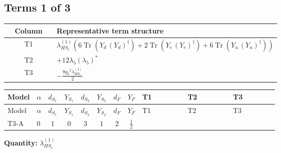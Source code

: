 \documentclass[8pt]{article}
\begin{document}
\begin{landscape}
\subsection*{Terms 1 of 3}
\begin{center}
\begin{tabular}{@{}c >{\raggedright\arraybackslash}p{0.82\linewidth}@{}}
\toprule
Column & Representative term structure \\
\midrule
T1 & \(\displaystyle {\lambda_{HS_1}^{(1)}} (6 \operatorname{Tr}\!\left({Y_d}\,\left({Y_d}\right)^{\dagger}\right)+2 \operatorname{Tr}\!\left({Y_e}\,\left({Y_e}\right)^{\dagger}\right)+6 \operatorname{Tr}\!\left({Y_u}\,\left({Y_u}\right)^{\dagger}\right))\) \\
\midrule
T2 & \(\displaystyle +12 {\lambda_5} \left({\lambda_5}\right)^{*}\) \\
\midrule
T3 & \(\displaystyle -\frac{9 {g_2}^2 {\lambda_{HS_1}^{(1)}}}{2}\) \\
\midrule
\bottomrule
\end{tabular}
\end{center}
\smallskip
\tiny
\begin{longtable}{@{}llcccccc >{\raggedright\arraybackslash}p{0.21\linewidth} >{\raggedright\arraybackslash}p{0.21\linewidth} >{\raggedright\arraybackslash}p{0.21\linewidth}@{}}
\toprule
Model & $\alpha$ & $d_{S_1}$ & $Y_{S_1}$ & $d_{S_2}$ & $Y_{S_2}$ & $d_F$ & $Y_F$ & T1 & T2 & T3 \\
\midrule
\endfirsthead
\toprule
Model & $\alpha$ & $d_{S_1}$ & $Y_{S_1}$ & $d_{S_2}$ & $Y_{S_2}$ & $d_F$ & $Y_F$ & T1 & T2 & T3 \\
\midrule
\endhead
T3-A & $0$ & $1$ & $0$ & $3$ & $1$ & $2$ & $\frac{1}{2}$ & \scriptsize\adjustbox{max width=\linewidth}{$\begin{gathered} {\lambda_{HS_1}^{(1)}} (6 \operatorname{Tr}\!\left({Y_d}\,\left({Y_d}\right)^{\dagger}\right)+2 \operatorname{Tr}\!\left({Y_e}\,\left({Y_e}\right)^{\dagger}\right)+6 \operatorname{Tr}\!\left({Y_u}\,\left({Y_u}\right)^{\dagger}\right))\end{gathered}$} & \scriptsize\adjustbox{max width=\linewidth}{$\begin{gathered} +12 {\lambda_5} \left({\lambda_5}\right)^{*}\end{gathered}$} & \scriptsize\adjustbox{max width=\linewidth}{$\begin{gathered} -\frac{9 {g_2}^2 {\lambda_{HS_1}^{(1)}}}{2}\end{gathered}$} \\
\midrule
\bottomrule
\end{longtable}
\clearpage
\noindent\textbf{Quantity: }$\lambda_{HS_1}^{(1)}$\par\smallskip

\end{landscape}
\end{document}
